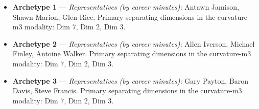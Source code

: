 \begin{itemize}
\item \textbf{Archetype 1} --- \emph{Representatives (by career minutes):} Antawn Jamison, Shawn Marion, Glen Rice. Primary separating dimensions in the curvature-m3 modality: Dim 7, Dim 2, Dim 3.
\item \textbf{Archetype 2} --- \emph{Representatives (by career minutes):} Allen Iverson, Michael Finley, Antoine Walker. Primary separating dimensions in the curvature-m3 modality: Dim 7, Dim 2, Dim 3.
\item \textbf{Archetype 3} --- \emph{Representatives (by career minutes):} Gary Payton, Baron Davis, Steve Francis. Primary separating dimensions in the curvature-m3 modality: Dim 7, Dim 2, Dim 3.
\end{itemize}
